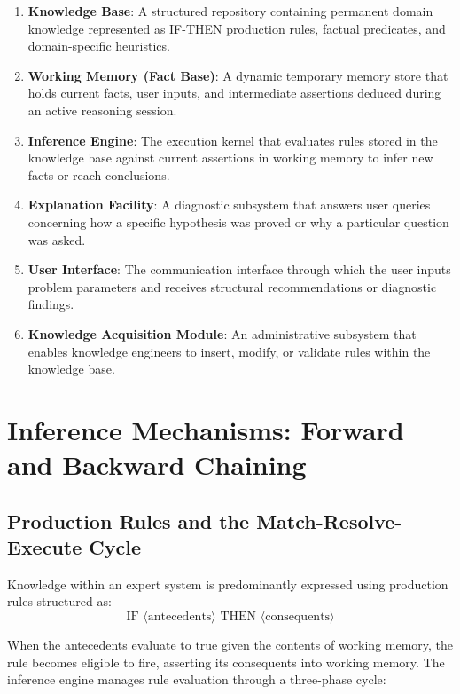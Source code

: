 \documentclass[12pt]{report}
\begin{document}
\begin{enumerate}
    \item \textbf{Knowledge Base}: A structured repository containing permanent domain knowledge represented as IF-THEN production rules, factual predicates, and domain-specific heuristics.
    \item \textbf{Working Memory (Fact Base)}: A dynamic temporary memory store that holds current facts, user inputs, and intermediate assertions deduced during an active reasoning session.
    \item \textbf{Inference Engine}: The execution kernel that evaluates rules stored in the knowledge base against current assertions in working memory to infer new facts or reach conclusions.
    \item \textbf{Explanation Facility}: A diagnostic subsystem that answers user queries concerning how a specific hypothesis was proved or why a particular question was asked.
    \item \textbf{User Interface}: The communication interface through which the user inputs problem parameters and receives structural recommendations or diagnostic findings.
    \item \textbf{Knowledge Acquisition Module}: An administrative subsystem that enables knowledge engineers to insert, modify, or validate rules within the knowledge base.
\end{enumerate}

\section{Inference Mechanisms: Forward and Backward Chaining}

\subsection{Production Rules and the Match-Resolve-Execute Cycle}

Knowledge within an expert system is predominantly expressed using production rules structured as:
\begin{equation*}
\text{IF } \langle \text{antecedents} \rangle \text{ THEN } \langle \text{consequents} \rangle
\end{equation*}

When the antecedents evaluate to true given the contents of working memory, the rule becomes eligible to fire, asserting its consequents into working memory. The inference engine manages rule evaluation through a three-phase cycle:
\end{document}
